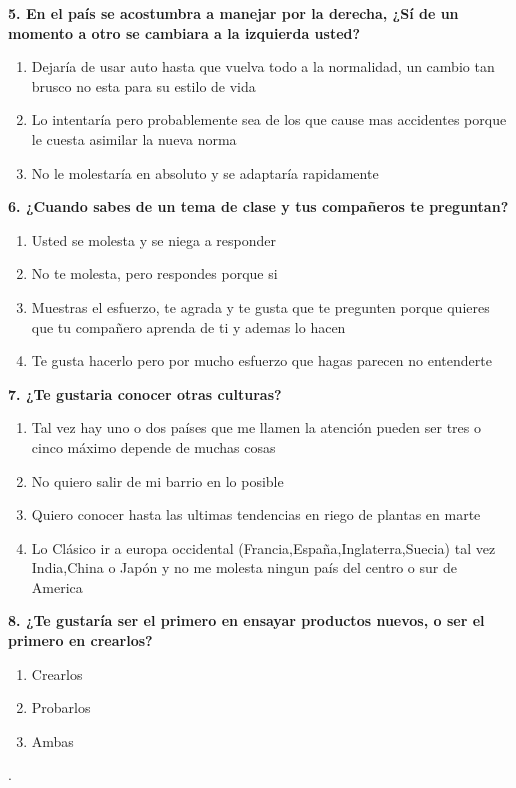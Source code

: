 \documentclass{article}
\begin{document}
\textbf{5. En el país se acostumbra a manejar por la derecha, ¿Sí de un momento a otro se cambiara a la izquierda usted?}
\begin{enumerate}[label=(\Alph*)] 
\item Dejaría de usar auto hasta que vuelva todo a la normalidad, un cambio tan brusco no esta para su estilo de vida
\item Lo intentaría pero probablemente sea de los que cause mas accidentes porque le cuesta asimilar la nueva norma
\item No le molestaría en absoluto y se adaptaría rapidamente
\end{enumerate}



 \textbf{6. ¿Cuando sabes de un tema de clase y tus compañeros te preguntan?}
\begin{enumerate}[label=(\Alph*)]
\item Usted se molesta y se niega a responder
\item No te molesta, pero respondes porque si
\item Muestras el esfuerzo, te agrada y te gusta que te pregunten porque quieres que tu compañero aprenda de ti y ademas lo hacen
\item Te gusta hacerlo pero por mucho esfuerzo que hagas parecen no entenderte 
 \end{enumerate}


\textbf{7. ¿Te gustaria conocer otras culturas?}
\begin{enumerate}[label=(\Alph*)]
\item Tal vez hay uno o dos países que me llamen la atención pueden ser tres o cinco máximo depende de muchas cosas
\item No quiero salir de mi barrio en lo posible
\item Quiero conocer hasta las ultimas tendencias en riego de plantas en marte
\item Lo Clásico ir a europa occidental (Francia,España,Inglaterra,Suecia) tal vez India,China o Japón y no me molesta ningun país del centro o sur de America 
 \end{enumerate}


\textbf{8. ¿Te gustaría ser el primero en ensayar productos nuevos, o ser el primero en crearlos?}

\begin{enumerate}[label=(\Alph*)]
\item Crearlos
\item Probarlos 
\item Ambas
\end{enumerate}.
\end{document}
